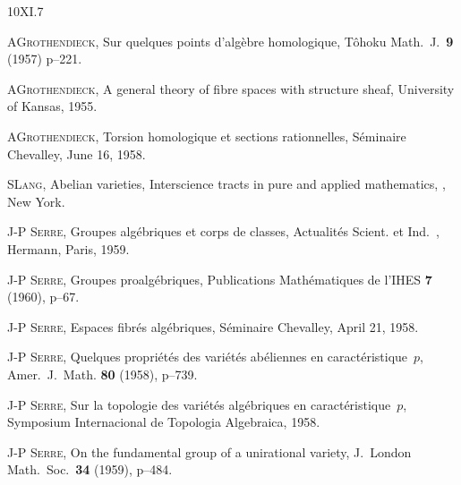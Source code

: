 \begin{thebibliography}{10}{XI.7}

 A\ptbl \textsc{Grothendieck},
Sur quelques points d'alg\`ebre homologique,
T\^ohoku Math.~J.\ \textbf{9} (1957) p--221.

 A\ptbl \textsc{Grothendieck}, A general theory of fibre spaces with
structure sheaf, University of Kansas, 1955.

 A\ptbl \textsc{Grothendieck}, Torsion homologique et sections
rationnelles, S\'eminaire \hbox{Chevalley}, June 16, 1958.

 S\ptbl \textsc{Lang}, Abelian varieties, Interscience tracts in pure
and applied mathematics, , New York.

J-P\ptbl%
\textsc{Serre}, Groupes alg\'ebriques et corps de classes,
Actualit\'es Scient. et Ind.\ , Hermann, Paris, 1959.

J-P\ptbl%
\textsc{Serre}, Groupes proalg\'ebriques,
Publications Math\'ematiques de l'IHES \textbf{7} (1960), p--67.

J-P\ptbl%
\textsc{Serre}, Espaces fibr\'es alg\'ebriques,
S\'eminaire Chevalley, April 21, 1958.

J-P\ptbl%
\textsc{Serre}, Quelques propri\'et\'es des
vari\'et\'es ab\'eliennes en
caract\'eristique~$p$, Amer.\ J.\ Math. \textbf{80} (1958), p--739.

J-P\ptbl%
\textsc{Serre}, Sur la topologie des vari\'et\'es
alg\'ebriques en
caract\'eristique~$p$,
Symposium Internacional de Topologia
Algebraica, 1958.

J-P\ptbl%
\textsc{Serre}, On the fundamental group of a unirational
variety,
J.~London Math.\ Soc.\ \textbf{34} (1959), p--484.
\end{thebibliography}
